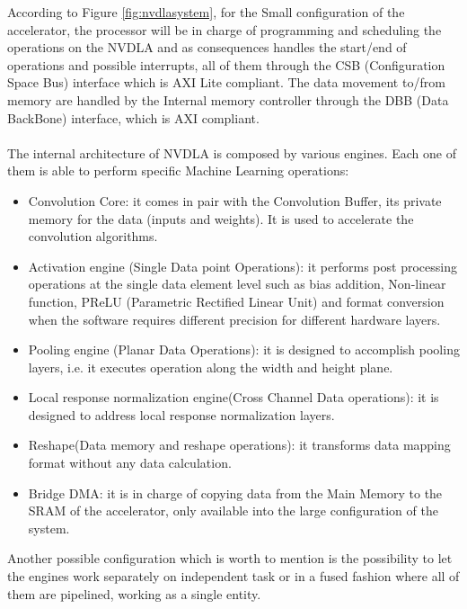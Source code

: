 According to Figure \ref{fig:nvdlasystem}, for the Small configuration of the accelerator, the processor will be in charge of programming and scheduling the operations on the NVDLA and as consequences handles the start/end of operations and possible interrupts, all of them through the CSB (Configuration Space Bus) interface which is AXI Lite compliant\cite{paper:30}. \newline
The data movement to/from memory are handled by the Internal memory controller through the DBB (Data BackBone) interface, which is AXI \cite{paper:30} compliant.\\\\

The internal architecture of NVDLA is composed by various engines. Each one of them is able to perform specific Machine Learning operations:
\begin{itemize}
\item Convolution Core: it comes in pair with the Convolution Buffer, its private memory for the data (inputs and weights). It is used to accelerate the convolution algorithms.
\item Activation engine (Single Data point Operations): it performs post processing operations at the single data element level such as bias addition, Non-linear function, PReLU (Parametric Rectified Linear Unit) and format conversion when the software requires different precision for different hardware layers.
\item Pooling engine (Planar Data Operations): it is designed to accomplish pooling layers, i.e. it executes operation along the width and height plane.
\item Local response normalization engine(Cross Channel Data operations): it is designed to address local response normalization layers.
\item Reshape(Data memory and reshape operations): it transforms data mapping format without any data calculation.
\item Bridge DMA: it is in charge of copying data from the Main Memory to the SRAM of the accelerator, only available into the large configuration of the system.
\end{itemize}

Another possible configuration which is worth to mention is the possibility to let the engines work separately on independent task or in a fused fashion where all of them are pipelined, working as a single entity.\\\\

